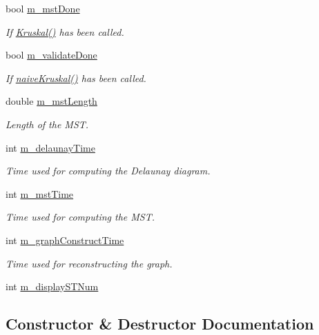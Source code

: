 \begin{DoxyCompactItemize}
\item 
bool \hyperlink{classcmst_1_1_graph2_d_ab7c087fe87b5750195100ff25f10f628}{m\_mstDone}
\begin{DoxyCompactList}\small\item\em If \hyperlink{classcmst_1_1_graph2_d_a034d2d37b2d106c0e25d7ad7bc67907e}{Kruskal()} has been called. \end{DoxyCompactList}\item 
bool \hyperlink{classcmst_1_1_graph2_d_ae609751f322449c3ac98303a8d6fa747}{m\_validateDone}
\begin{DoxyCompactList}\small\item\em If \hyperlink{classcmst_1_1_graph2_d_af0db14845e80799be1d4fb15ca230110}{naiveKruskal()} has been called. \end{DoxyCompactList}\item 
double \hyperlink{classcmst_1_1_graph2_d_a722498b25b96d26e68e378ba970d5e65}{m\_mstLength}
\begin{DoxyCompactList}\small\item\em Length of the MST. \end{DoxyCompactList}\item 
int \hyperlink{classcmst_1_1_graph2_d_a869a2fef63a6dbc8733056afd9ad0b71}{m\_delaunayTime}
\begin{DoxyCompactList}\small\item\em Time used for computing the Delaunay diagram. \end{DoxyCompactList}\item 
int \hyperlink{classcmst_1_1_graph2_d_a447f3d36666c57d2f15bddc1e3126f1e}{m\_mstTime}
\begin{DoxyCompactList}\small\item\em Time used for computing the MST. \end{DoxyCompactList}\item 
int \hyperlink{classcmst_1_1_graph2_d_ac594da90a2c9bd7332644532969ef11f}{m\_graphConstructTime}
\begin{DoxyCompactList}\small\item\em Time used for reconstructing the graph. \end{DoxyCompactList}\item 
int \hyperlink{classcmst_1_1_graph2_d_aa5479777b7d8650b85c15b1f8a54bd95}{m\_displaySTNum}
\end{DoxyCompactItemize}


\subsection{Constructor \& Destructor Documentation}
